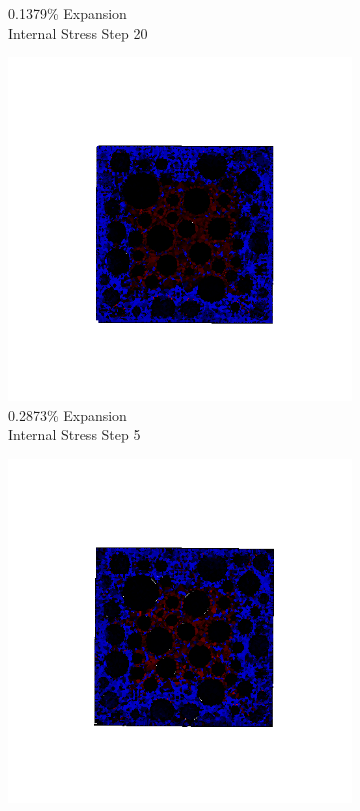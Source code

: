 \begin{figure}[ht!]
\begin{subfigure}{.25\textwidth}
      \caption{0.1379\% Expansion\\Internal Stress Step 20}
    \end{subfigure}
    \begin{subfigure}{.25\textwidth}
      \centering
      \includegraphics[width=1.0\linewidth]{Files/exp_3D/DEF/A30X0C_2_s5.png}
      \caption{0.2873\% Expansion\\Internal Stress Step 5}
    \end{subfigure}%
    \begin{subfigure}{.25\textwidth}
      \centering
      \includegraphics[width=1.0\linewidth]{Files/exp_3D/DEF/A30X0C_2_s10.png}

\end{subfigure}
\end{figure}
